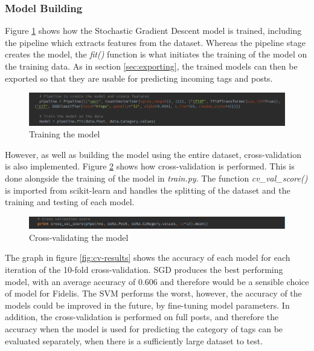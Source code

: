 \subsubsection{Model Building}
Figure \ref{fig:imp-content-train} shows how the Stochastic Gradient Descent model is trained, including the pipeline which extracts features from the dataset. Whereas the pipeline stage creates the model, the \textit{fit()} function is what initiates the training of the model on the training data. As in section \ref{sec:exporting}, the trained models can then be exported so that they are usable for predicting incoming tags and posts.

\begin{figure}[H]
\centering
\includegraphics[width=\textwidth]{Images/Implementation/content-train}
\caption{Training the model}
\label{fig:imp-content-train}
\end{figure}

However, as well as building the model using the entire dataset, cross-validation is also implemented. Figure \ref{fig:content-cv} shows how cross-validation is performed. This is done alongside the training of the model in \emph{train.py}. The function \textit{cv\_val\_score()} is imported from scikit-learn and handles the splitting of the dataset and the training and testing of each model.

\begin{figure}[H]
\centering
\includegraphics[width=\textwidth]{Images/Implementation/content-cv}
\caption{Cross-validating the model}
\label{fig:content-cv}
\end{figure}

The graph in figure \ref{fig:cv-results} shows the accuracy of each model for each iteration of the 10-fold cross-validation. SGD produces the best performing model, with an average accuracy of 0.606 and therefore would be a sensible choice of model for Fidelis. The SVM performs the worst, however, the accuracy of the models could be improved in the future, by fine-tuning model parameters. In addition, the cross-validation is performed on full posts, and therefore the accuracy when the model is used for predicting the category of tags can be evaluated separately, when there is a sufficiently large dataset to test.

